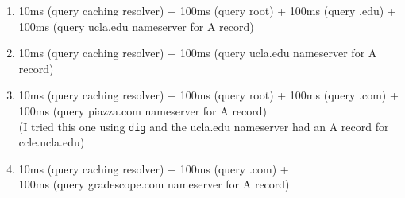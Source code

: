 \documentclass{report}
\begin{document}
\begin{problem}
\begin{answer}{30em}
\begin{enumerate}
  \item 10ms (query caching resolver) + 100ms (query root) +
        100ms (query .edu) + \\ 100ms (query ucla.edu nameserver for A record)
  \item 10ms (query caching resolver) + 100ms (query ucla.edu nameserver for A record)
  \item 10ms (query caching resolver) + 100ms (query root) +
        100ms (query .com) + \\ 100ms (query piazza.com nameserver for A record) \\
        (I tried this one using \texttt{dig} and the ucla.edu nameserver had an
        A record for ccle.ucla.edu)
  \item 10ms (query caching resolver) + 100ms (query .com) + \\
        100ms (query gradescope.com nameserver for A record)
  \end{enumerate}
\end{answer}


\end{problem}
\end{document}
